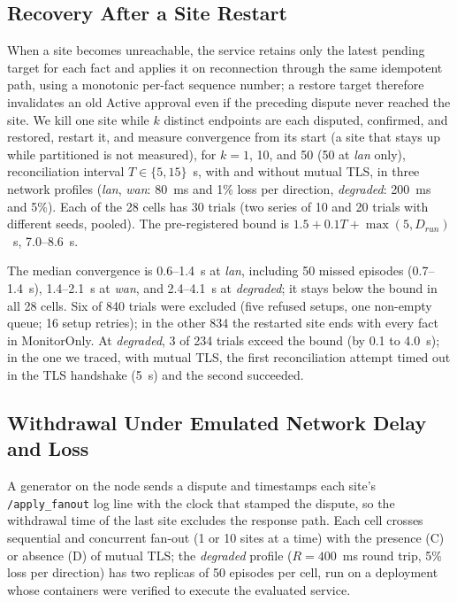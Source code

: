 \documentclass[journal]{IEEEtran}
\theoremstyle{definition}
\begin{document}
\subsection{Recovery After a Site Restart}
\label{sec:scalability-results}
When a site becomes unreachable, the service retains only the latest pending target for each fact and applies it on reconnection through the same idempotent path, using a monotonic per-fact sequence number; a restore target therefore invalidates an old Active approval even if the preceding dispute never reached the site. We kill one site while $k$ distinct endpoints are each disputed, confirmed, and restored, restart it, and measure convergence from its start (a site that stays up while partitioned is not measured), for $k=1$, 10, and 50 (50 at \emph{lan} only), reconciliation interval $T\in\{5,15\}$~s, with and without mutual TLS, in three network profiles (\emph{lan}, \emph{wan}: 80~ms and 1\% loss per direction, \emph{degraded}: 200~ms and 5\%). Each of the 28 cells has 30 trials (two series of 10 and 20 trials with different seeds, pooled). The pre-registered bound is $1.5+0.1T+\max(5,D_{run})$~s, 7.0--8.6~s.

The median convergence is 0.6--1.4~s at \emph{lan}, including 50 missed episodes (0.7--1.4~s), 1.4--2.1~s at \emph{wan}, and 2.4--4.1~s at \emph{degraded}; it stays below the bound in all 28 cells. Six of 840 trials were excluded (five refused setups, one non-empty queue; 16 setup retries); in the other 834 the restarted site ends with every fact in MonitorOnly. At \emph{degraded}, 3 of 234 trials exceed the bound (by 0.1 to 4.0~s); in the one we traced, with mutual TLS, the first reconciliation attempt timed out in the TLS handshake (5~s) and the second succeeded.

\subsection{Withdrawal Under Emulated Network Delay and Loss}
\label{sec:netem-results}
A generator on the node sends a dispute and timestamps each site's \texttt{/apply\_fanout} log line with the clock that stamped the dispute, so the withdrawal time of the last site excludes the response path. Each cell crosses sequential and concurrent fan-out (1 or 10 sites at a time) with the presence (C) or absence (D) of mutual TLS; the \emph{degraded} profile ($R=400$~ms round trip, 5\% loss per direction) has two replicas of 50 episodes per cell, run on a deployment whose containers were verified to execute the evaluated service.
\end{document}

